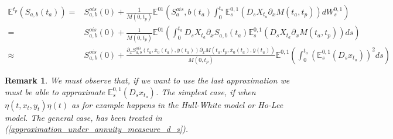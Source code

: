 \documentclass[a4paper,10pt]{article}
\newtheorem{remark}[theorem]{Remark}
\newcommand{\1}{\mathbf{1}}
\begin{document}
\begin{align}\label{cms_first_order_convexity}
\mathbb{E}^{t_p}\left(S_{a,b}(t_a)\right) =& S^{ois}_{a,b}(0) + \frac{1}{M(0,t_p)} \mathbb{E}^{01}\left( S^{ois}_a,b(t_a) \int_{0}^{t_a} \mathbb{E}^{0,1}_s\left(D_sX_{t_a}\partial_x M(t_a,t_p)  \right) dW^{0,1}_s   \right) \nonumber \\
=&  S^{ois}_{a,b}(0) + \frac{1}{M(0,t_p)} \mathbb{E}^{01}\left(\int_{0}^{t_a} D_s X_{t_a} \partial_x S_{a,b}(t_a) \mathbb{E}^{0,1}_s\left(D_sX_{t_a}\partial_x M(t_a,t_p)  \right) ds   \right) \nonumber \\
\approx&  S^{ois}_{a,b}(0) + \frac{\partial_x S^{ois}_{a,b}(t_a, \bar{x}_0(t_a),\bar{y}(t_a))\partial_x M(t_a,t_p, \bar{x}_0(t_a),\bar{y}(t_a))}{M(0,t_p)} \mathbb{E}^{0,1}\left( \int_{0}^{t_a} \left(\mathbb{E}_s^{0,1}\left( D_s x_{t_a}\right)\right)^{2} ds  \right)
\end{align}

\begin{remark}
We must observe that, if we want to use the last approximation  we must be able to approximate $\mathbb{E}_s^{0,1}\left( D_s x_{t_a}\right)$. The simplest case, if when $\eta(t,x_t,y_t) \eta(t)$ as for example happens in the Hull-White model or Ho-Lee model. The general case, has been treated in (\ref{approximation_under_annuity_measeure_d_s}). 
\end{remark}
\end{document}
